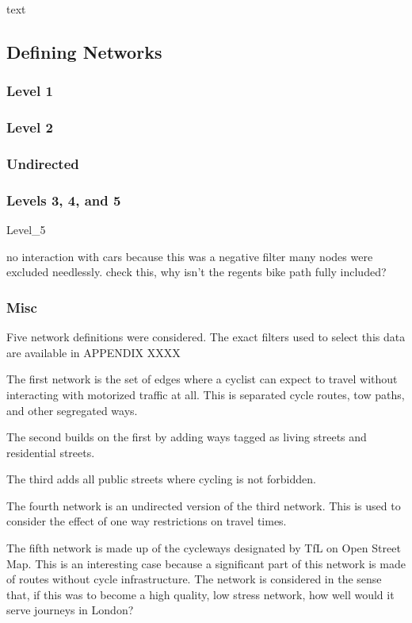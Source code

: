 text

\subsection{Defining Networks}

\subsubsection{Level 1}

\subsubsection{Level 2}

\subsubsection{Undirected}

\subsubsection{Levels 3, 4, and 5}


Level\_5

no interaction with cars
because this was a negative filter many nodes were excluded needlessly. 
check this, why isn't the regents bike path fully included?


\subsubsection{Misc}

Five network definitions were considered. The exact filters used to select this data are available in APPENDIX XXXX 

The first network is the set of edges where a cyclist can expect to travel without interacting with motorized traffic at all. This is separated cycle routes, tow paths, and other segregated ways. 

The second builds on the first by adding ways tagged as living streets and residential streets.

The third adds all public streets where cycling is not forbidden. 

The fourth network is an undirected version of the third network. This is used to consider the effect of one way restrictions on travel times. 

The fifth network is made up of the cycleways designated by TfL on Open Street Map. This is an interesting case because a significant part of this network is made of routes without cycle infrastructure. The network is considered in the sense that, if this was to become a high quality, low stress network, how well would it serve journeys in London? 


